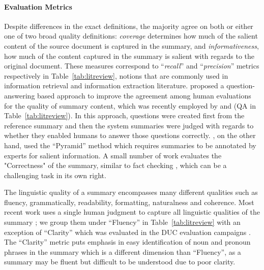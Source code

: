 \documentclass[11pt,a4paper]{article}
\begin{document}
\paragraph{Evaluation Metrics}
Despite differences in the exact definitions,
the majority \citep[e.g.,][]{Hsu2018,Celikyilmaz2018,narayan18xsum,Chen2018a,Peyrard2018a} agree on both or either one of two broad quality definitions: {\em coverage} determines how much of the salient content of the source document is captured in the summary,
and {\em informativeness}, 
how much of the content captured in the summary is salient with regards to the original document.
These measures correspond to 
``\textit{recall}'' and ``\textit{precision}'' metrics respectively in Table~\ref{tab:litreview}, notions that are commonly used in information retrieval and information extraction literature.
\citet{Clarke2010} proposed a question-answering based approach to improve the agreement among human evaluations for the quality of summary content, which was recently employed by \citet{narayan18xsum} and \citet{Narayan2018} (QA in Table~\ref{tab:litreview}). In this approach,  questions were created first from the reference summary and then the system summaries were judged with regards to whether they enabled humans to answer those questions correctly. \citet{ShafieiBavani2018}, on the other hand, used the ``Pyramid'' method \citep{Nenkova2004a} which requires summaries to be annotated by experts for salient information. %
A small number of work evaluates the "Correctness" \citep{Chen2018a,Li2018a,Chen2018a} of the summary, similar to fact checking \cite{vlachos-riedel:2014:W14-25}, which can be a challenging task in its own right.

The linguistic quality of a summary encompasses many different qualities such as fluency, grammatically, readability, formatting, naturalness and coherence. Most recent work uses 
a single human judgment
to capture all linguistic qualities of the summary \cite{Hsu2018,Kryscinski2018,narayan18xsum,Song2018,Guo2018a}; we group them under ``Fluency'' in Table~\ref{tab:litreview} with an exception of ``Clarity'' which was evaluated in the DUC evaluation campaigns \citep{dang2005overview}. The ``Clarity'' metric puts emphasis in easy identification of noun and pronoun phrases in the summary which is a different dimension than ``Fluency'', as a summary may be fluent but difficult to be understood due to poor clarity. %
\end{document}
